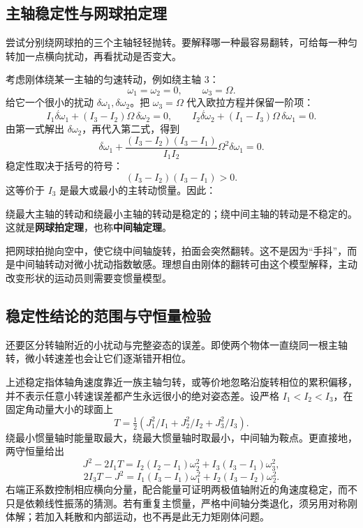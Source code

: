 \subsection{主轴稳定性与网球拍定理}

尝试分别绕网球拍的三个主轴轻轻抛转。要解释哪一种最容易翻转，可给每一种匀转加一点横向扰动，再看扰动是否变大。

考虑刚体绕某一主轴的匀速转动，例如绕主轴 3：
\[
\omega_1=\omega_2=0,\qquad \omega_3=\Omega.
\]
给它一个很小的扰动 \(\delta\omega_1,\delta\omega_2\)。把 \(\omega_3=\Omega\) 代入欧拉方程并保留一阶项：
\[
I_1\dot{\delta\omega}_1+(I_3-I_2)\Omega\,\delta\omega_2=0,
\qquad
I_2\dot{\delta\omega}_2+(I_1-I_3)\Omega\,\delta\omega_1=0.
\]
由第一式解出 \(\delta\omega_2\)，再代入第二式，得到
\begin{equation}
\ddot{\delta\omega}_1
+\frac{(I_3-I_2)(I_3-I_1)}{I_1I_2}\Omega^2
\delta\omega_1=0.
\label{eq:principal-stability}
\end{equation}
稳定性取决于括号的符号：
\[
(I_3-I_2)(I_3-I_1)>0.
\]
这等价于 \(I_3\) 是最大或最小的主转动惯量。因此：

\begin{keybox}
绕最大主轴的转动和绕最小主轴的转动是稳定的；绕中间主轴的转动是不稳定的。这就是\textbf{网球拍定理}，也称\textbf{中间轴定理}。
\end{keybox}

把网球拍抛向空中，使它绕中间轴旋转，拍面会突然翻转。这不是因为“手抖”，而是中间轴转动对微小扰动指数敏感。理想自由刚体的翻转可由这个模型解释，主动改变形状的运动员则需要变惯量模型。



\subsection{稳定性结论的范围与守恒量检验}
还要区分转轴附近的小扰动与完整姿态的误差。即使两个物体一直绕同一根主轴转，微小转速差也会让它们逐渐错开相位。

上述稳定指体轴角速度靠近一族主轴匀转，或等价地忽略沿旋转相位的累积偏移，并不表示任意小转速误差都产生永远很小的绝对姿态差。设严格 $I_1<I_2<I_3$，在固定角动量大小的球面上
\[
T=\tfrac12(J_1^2/I_1+J_2^2/I_2+J_3^2/I_3).
\]
绕最小惯量轴时能量取最大，绕最大惯量轴时取最小，中间轴为鞍点。更直接地，两守恒量给出
\[
J^2-2I_1T=I_2(I_2-I_1)\omega_2^2+I_3(I_3-I_1)\omega_3^2,
\]
\[
2I_3T-J^2=I_1(I_3-I_1)\omega_1^2+I_2(I_3-I_2)\omega_2^2.
\]
右端正系数控制相应横向分量，配合能量可证明两极值轴附近的角速度稳定，而不只是依赖线性振荡的猜测。若有重复主惯量，严格中间轴分类退化，须另用对称刚体解；若加入耗散和内部运动，也不再是此无力矩刚体问题。

